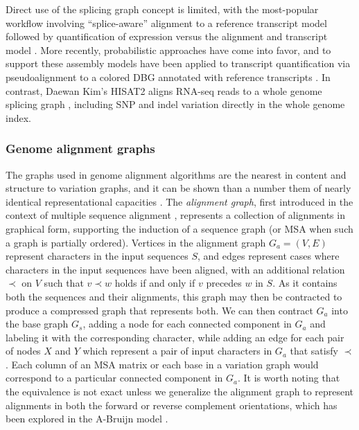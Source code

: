 Direct use of the splicing graph concept is limited, with the most-popular workflow involving ``splice-aware'' alignment to a reference transcript model followed by quantification of expression versus the alignment and transcript model \cite{trapnell2012differential}.
More recently, probabilistic approaches have come into favor, and to support these assembly models have been applied to transcript quantification via pseudoalignment to a colored DBG annotated with reference transcripts \cite{bray2016near}.
In contrast, Daewan Kim's HISAT2 aligns RNA-seq reads to a whole genome splicing graph \cite{kim2015hisat,kim2017hisat2}, including SNP and indel variation directly in the whole genome index.

\subsubsection{Genome alignment graphs}
\label{sec:genome_alignment_graphs}
The graphs used in genome alignment algorithms are the nearest in content and structure to variation graphs, and it can be shown than a number them of nearly identical representational capacities \cite{kehr2014genome}.
The \emph{alignment graph}, first introduced in the context of multiple sequence alignment \cite{kececioglu1993maximum,rausch2008segment}, represents a collection of alignments in graphical form, supporting the induction of a sequence graph (or MSA when such a graph is partially ordered).
Vertices in the alignment graph $G_a = (V, E)$ represent characters in the input sequences $S$, and edges represent cases where characters in the input sequences have been aligned, with an additional relation $\prec$ on $V$ such that $v \prec w$ holds if and only if $v$ precedes $w$ in $S$.
As it contains both the sequences and their alignments, this graph may then be contracted to produce a compressed graph that represents both.
We can then contract $G_a$ into the base graph $G_s$, adding a node for each connected component in $G_a$ and labeling it with the corresponding character, while adding an edge for each pair of nodes $X$ and $Y$ which represent a pair of input characters in $G_a$ that satisfy $\prec$.
Each column of an MSA matrix or each base in a variation graph would correspond to a particular connected component in $G_a$.
It is worth noting that the equivalence is not exact unless we generalize the alignment graph to represent alignments in both the forward or reverse complement orientations, which has been explored in the A-Bruijn model \cite{raphael2004novel}.

